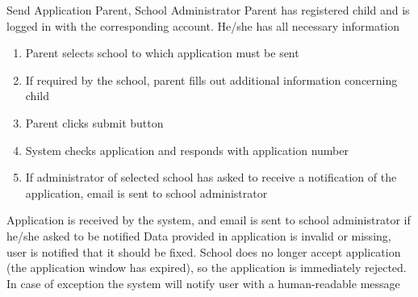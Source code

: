 \usecase{}        
{}
{Send Application}
{Parent, School Administrator}
{Parent has registered child and is logged in with the corresponding account. 
    He/she has all necessary information}
{
\begin{enumerate}
    \item Parent selects school to which application must be sent
    \item If required by the school, parent fills out additional information concerning child
    \item Parent clicks submit button
    \item System checks application and responds with application number
    \item If administrator of selected school has asked to receive a notification of the application, email is sent to school administrator
\end{enumerate}
}
{Application is received by the system, and email is sent to school administrator if he/she asked to be notified}
{Data provided in application is invalid or missing, user is notified that it should be fixed.
 School does no longer accept application (the application window has expired), so the application is immediately rejected.}
{In case of exception the system will notify user with a human-readable message}